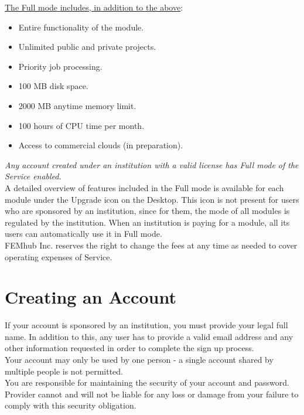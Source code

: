 \documentclass{article}
\begin{document}
\noindent
\underline{The Full mode includes, in addition to the above}:

\begin{itemize}
\item Entire functionality of the module.
\item Unlimited public and private projects.
\item Priority job processing. 
\item 100 MB disk space.
\item 2000 MB anytime memory limit.
\item 100 hours of CPU time per month.
\item Access to commercial clouds (in preparation).
\end{itemize}
{\em Any account created under an institution with a valid license has Full mode of the Service enabled.}\\

\noindent
A detailed overview of features included in the Full mode is available for each module under the Upgrade icon on the Desktop. This icon is not present for users who are sponsored by an institution, since for them, the mode of all modules is regulated by the institution. When an institution is paying for a module, all its users can automatically use it in Full mode. \\

\noindent
FEMhub Inc. reserves the right to change the fees at any time as needed to cover operating expenses of Service. 

\section*{Creating an Account} 

If your account is sponsored by an institution, you must provide your legal full name. In addition to this, any user has to provide a valid email address and any other information requested in order to complete the sign up process.\\

\noindent
Your account may only be used by one person - a single account shared by multiple people is not permitted.  \\

\noindent
You are responsible for maintaining the security of your account and password. Provider cannot and will not be liable for any loss or damage from your failure to comply with this security obligation.\\
\end{document}
